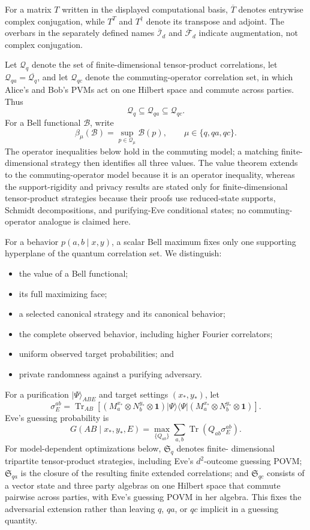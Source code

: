 \documentclass[11pt]{article}
\theoremstyle{definition}
\theoremstyle{remark}
\newcommand{\Id}{\mathbf 1}
\newcommand{\cI}{\mathcal I}
\newcommand{\cF}{\mathcal F}
\newcommand{\Tr}{\operatorname{Tr}}
\begin{document}
For a matrix \(T\) written in the displayed computational basis,
\(\overline T\) denotes entrywise complex conjugation, while \(T^T\) and
\(T^\dagger\) denote its transpose and adjoint.  The overbars in the
separately defined names \(\overline{\cI}_d\) and \(\overline{\cF}_d\)
indicate augmentation, not complex conjugation.

Let \(\mathcal Q_q\) denote the set of finite-dimensional tensor-product
correlations, let \(\mathcal Q_{qa}=\overline{\mathcal Q_q}\), and let
\(\mathcal Q_{qc}\) denote the commuting-operator correlation set, in which
Alice's and Bob's PVMs act on one Hilbert space and commute across parties.
Thus
\[
 \mathcal Q_q\subseteq\mathcal Q_{qa}\subseteq\mathcal Q_{qc}.
\]
For a Bell functional \(\mathcal B\), write
\[
 \beta_\mu(\mathcal B)
 =\sup_{p\in\mathcal Q_\mu}\mathcal B(p),
 \qquad \mu\in\{q,qa,qc\}.
\]
The operator inequalities below hold in the commuting model; a matching
finite-dimensional strategy then identifies all three values.
The value theorem extends to the commuting-operator model because it is an
operator inequality, whereas the support-rigidity and privacy results are
stated only for finite-dimensional tensor-product strategies because their
proofs use reduced-state supports, Schmidt decompositions, and purifying-Eve
conditional states; no commuting-operator analogue is claimed here.

For a behavior \(p(a,b\mid x,y)\), a scalar Bell maximum fixes only one
supporting hyperplane of the quantum correlation set.  We distinguish:
\begin{itemize}[leftmargin=1.5em]
\item the value of a Bell functional;
\item its full maximizing face;
\item a selected canonical strategy and its canonical behavior;
\item the complete observed behavior, including higher Fourier correlators;
\item uniform observed target probabilities; and
\item private randomness against a purifying adversary.
\end{itemize}

For a purification \(\lvert\Psi\rangle_{ABE}\) and target settings
\((x_*,y_*)\), let
\[
 \sigma_E^{ab}
 =\Tr_{AB}\!\left[(M_a^{x_*}\otimes N_b^{y_*}\otimes\Id)
 \lvert\Psi\rangle\!\langle\Psi\rvert
 (M_a^{x_*}\otimes N_b^{y_*}\otimes\Id)\right].
\]
Eve's guessing probability is
\[
 G(AB\mid x_*,y_*,E)
 =\max_{\{Q_{ab}\}}\sum_{a,b}\Tr(Q_{ab}\sigma_E^{ab}).
\]
For model-dependent optimizations below, \(\mathfrak S_q\) denotes finite-
dimensional tripartite tensor-product strategies, including Eve's
\(d^2\)-outcome guessing POVM; \(\mathfrak S_{qa}\) is the closure of the
resulting finite extended correlations; and \(\mathfrak S_{qc}\) consists of
a vector state and three party algebras on one Hilbert space that commute
pairwise across parties, with Eve's guessing POVM in her algebra.  This fixes
the adversarial extension rather than leaving \(q\), \(qa\), or \(qc\)
implicit in a guessing quantity.
\end{document}
